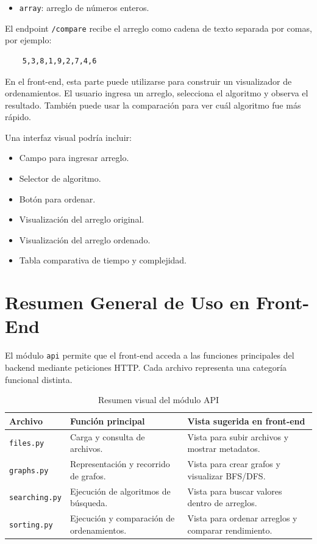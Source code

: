 \documentclass[12pt]{article}
\begin{document}
\begin{itemize}
	\item \texttt{array}: arreglo de números enteros.
\end{itemize}

El endpoint \texttt{/compare} recibe el arreglo como cadena de texto separada por comas, por ejemplo:

\begin{verbatim}
	5,3,8,1,9,2,7,4,6
\end{verbatim}

En el front-end, esta parte puede utilizarse para construir un visualizador de ordenamientos. El usuario ingresa un arreglo, selecciona el algoritmo y observa el resultado. También puede usar la comparación para ver cuál algoritmo fue más rápido.

Una interfaz visual podría incluir:

\begin{itemize}
	\item Campo para ingresar arreglo.
	\item Selector de algoritmo.
	\item Botón para ordenar.
	\item Visualización del arreglo original.
	\item Visualización del arreglo ordenado.
	\item Tabla comparativa de tiempo y complejidad.
\end{itemize}

\section{Resumen General de Uso en Front-End}

El módulo \texttt{api} permite que el front-end acceda a las funciones principales del backend mediante peticiones HTTP. Cada archivo representa una categoría funcional distinta.

\begin{table}[H]
	\centering
	\begin{tabular}{|p{3.5cm}|p{5cm}|p{5.5cm}|}
		\hline
		\textbf{Archivo} & \textbf{Función principal} & \textbf{Vista sugerida en front-end} \\
		\hline
		\texttt{files.py} & Carga y consulta de archivos. & Vista para subir archivos y mostrar metadatos. \\
		\hline
		\texttt{graphs.py} & Representación y recorrido de grafos. & Vista para crear grafos y visualizar BFS/DFS. \\
		\hline
		\texttt{searching.py} & Ejecución de algoritmos de búsqueda. & Vista para buscar valores dentro de arreglos. \\
		\hline
		\texttt{sorting.py} & Ejecución y comparación de ordenamientos. & Vista para ordenar arreglos y comparar rendimiento. \\
		\hline
	\end{tabular}
	\caption{Resumen visual del módulo API}
\end{table}
\end{document}
